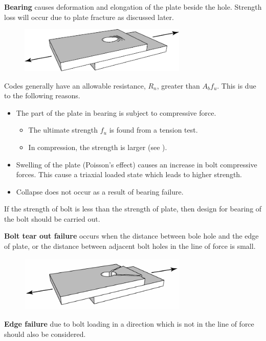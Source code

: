\textbf{Bearing} causes deformation and elongation of the plate beside the hole. Strength loss will occur due to plate fracture as discussed later.
\begin{figure}[H]
\centering
\includegraphics[width=8cm]{PIC/CH06/BBEAR}
\end{figure}

Codes generally have an allowable resistance, $R_n$, greater than $A_bf_u$. This is due to the following reasons.
\begin{itemize}
\item The part of the plate in bearing is subject to compressive force.
\begin{itemize}
\item The ultimate strength $f_u$ is found from a tension test.
\item In compression, the strength is larger (see ).
\end{itemize}
\item Swelling of the plate (Poisson's effect) causes an increase in bolt compressive forces. This cause a triaxial loaded state which leads to higher strength.
\item Collapse does not occur as a result of bearing failure.
\end{itemize}

If the strength of bolt is less than the strength of plate, then design for bearing of the bolt should be carried out.

\textbf{Bolt tear out failure} occurs when the distance between bole hole and the edge of plate, or the distance between adjacent bolt holes in the line of force is small.
\begin{figure}[H]
\centering
\includegraphics[width=8cm]{PIC/CH06/BTEAR}
\end{figure}

\textbf{Edge failure} due to bolt loading in a direction which is not in the line of force should also be considered.

